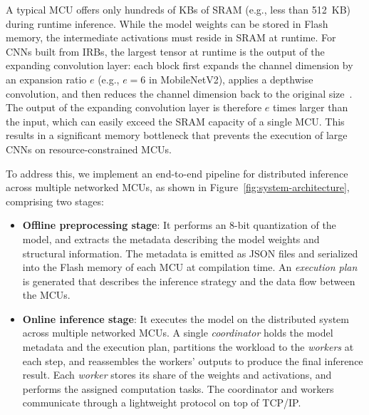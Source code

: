 A typical MCU offers only hundreds of KBs of SRAM (e.g., less than 512~KB) during runtime inference. While the model weights can be stored in Flash memory, the intermediate activations must reside in SRAM at runtime. For CNNs built from IRBs, the largest tensor at runtime is the output of the expanding convolution layer: each block first expands the channel dimension by an expansion ratio $e$ (e.g., $e=6$ in MobileNetV2), applies a depthwise convolution, and then reduces the channel dimension back to the original size~\cite{mobilenetv2}. The output of the expanding convolution layer is therefore $e$ times larger than the input, which can easily exceed the SRAM capacity of a single MCU. This results in a significant memory bottleneck that prevents the execution of large CNNs on resource-constrained MCUs. 

To address this, we implement an end-to-end pipeline for distributed inference across multiple networked MCUs, as shown in Figure~\ref{fig:system-architecture}, comprising two stages:
\begin{itemize}
    \item \textbf{Offline preprocessing stage}: It performs an 8-bit quantization of the model, and extracts the metadata describing the model weights and structural information. The metadata is emitted as JSON files and serialized into the Flash memory of each MCU at compilation time. An \emph{execution plan} is generated that describes the inference strategy and the data flow between the MCUs.
    
    \item \textbf{Online inference stage}: It executes the model on the distributed system across multiple networked MCUs. A single \emph{coordinator} holds the model metadata and the execution plan, partitions the workload to the \emph{workers} at each step, and reassembles the workers' outputs to produce the final inference result. Each \emph{worker} stores its share of the weights and activations, and performs the assigned computation tasks. The coordinator and workers communicate through a lightweight protocol on top of TCP/IP.
\end{itemize}


